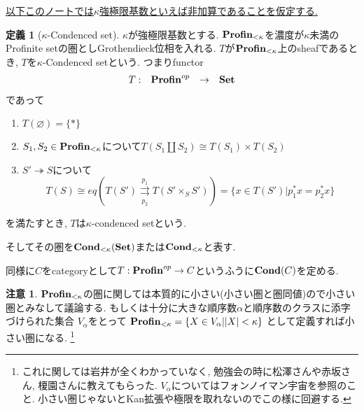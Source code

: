 \documentclass[dvipdfmx,a4paper,11pt]{article}
\theoremstyle{definition}
\newtheorem{dfn}[thm]{定義}
\newtheorem{rem}[thm]{注意}
\begin{document}
\underline{ 以下このノートでは$\kappa$強極限基数といえば非加算であることを仮定する.}
 
 \begin{tcolorbox}
 [colback = white, colframe = green!35!black, fonttitle = \bfseries,breakable = true]
\begin{dfn}[$\kappa$-Condenced set] \cite[Remark 1.3]{Sch19}
$\kappa$が強極限基数とする. 
${ \bf Profin}_{< \kappa}$を濃度が$\kappa$未満のProfinite setの圏としGrothendieck位相を入れる.
$T$が${ \bf Profin}_{< \kappa}$上のsheafであるとき, $T$を$\kappa$-Condenced setという. 
つまりfunctor
 $$
\begin{array}{cccc}
T : &{\bf Profin}^{op}& \rightarrow &{\bf Set}  \\
\end{array}
$$
であって
\begin{enumerate}
\item $T(\varnothing) = \{ \ast\}$
\item $S_1, S_2 \in {\bf Profin}_{< \kappa}$について$T(S_1 \coprod S_2) \cong T(S_1) \times T(S_2)$
\item $S' \twoheadrightarrow S$について
$$
T(S) \cong eq(T(S')\underset{p_2}{\overset{p_1}{\rightrightarrows}} T(S' \times_{S} S'))
=\{ x \in T(S') | p_{1}^{*}x = p_{2}^{*}x\}
$$
\end{enumerate}
を満たすとき, $T$は$\kappa$-condenced setという. 

そしてその圏を${\bf Cond}_{<\kappa}({\bf Set})$または${\bf Cond}_{<\kappa}$と表す. 
 \end{dfn}
 \end{tcolorbox}
 同様に$C$をcategoryとして$T : {\bf Profin}^{op} \rightarrow  C$というふうに${\bf Cond}(C)$を定める. 
 
 \begin{rem}
$ { \bf Profin}_{< \kappa}$の圏に関しては本質的に小さい(小さい圏と圏同値)ので小さい圏とみなして議論する. 
もしくは十分に大きな順序数$\alpha$と順序数のクラスに添字づけられた集合
$V_{\alpha}$をとって
$ {\bf Profin}_{< \kappa} = \{ X\in V_{\alpha} | |X|<\kappa\}$
として定義すれば小さい圏になる. \footnote{これに関しては岩井が全くわかっていなく, 勉強会の時に松澤さんや赤坂さん, 榎園さんに教えてもらった. $V_{\alpha}$についてはフォンノイマン宇宙を参照のこと. 小さい圏じゃないとKan拡張や極限を取れないのでこの様に回避する.}
 \end{rem}
\end{document}
